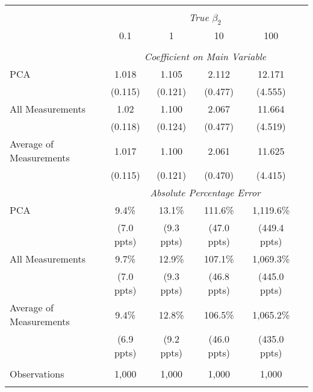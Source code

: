 \begin{table}[!htbp] \centering
\begin{tabular}{@{\extracolsep{5pt}}lccccc}
\\[-1.8ex]\hline
\hline \\[-1.8ex]
& \multicolumn{5}{c}{\textit{True $\beta_2$}} \
\cr \cline{5-6}
\\[-1.8ex] & 0.1 & 1 & 10 & 100 \\
\hline \\[-1.8ex]
& \multicolumn{5}{c}{\textit{Coefficient on Main Variable}} \\
 PCA & 1.018 & 1.105 & 2.112 & 12.171  \\
  & (0.115) & (0.121) & (0.477) & (4.555)\\
 All Measurements & 1.02 & 1.100 & 2.067 & 11.664  \\
  & (0.118) & (0.124) & (0.477) & (4.519)\\
 Average of Measurements & 1.017 & 1.100 & 2.061 & 11.625  \\
  & (0.115) & (0.121) & (0.470) & (4.415)\\
& \multicolumn{5}{c}{\textit{Absolute Percentage Error}} \\
  PCA & 9.4\% & 13.1\% & 111.6\% & 1,119.6\%  \\
   & (7.0 ppts) & (9.3 ppts) & (47.0 ppts) & (449.4 ppts)\\
All Measurements & 9.7\% & 12.9\% & 107.1\% & 1,069.3\%  \\
  & (7.0 ppts) & (9.3 ppts) & (46.8 ppts) & (445.0 ppts)\\
  Average of Measurements & 9.4\% & 12.8\% & 106.5\% & 1,065.2\%  \\
  & (6.9 ppts) & (9.2 ppts) & (46.0 ppts) & (435.0 ppts)\\
\hline \\[-1.8ex]
 Observations & 1,000 & 1,000 & 1,000 & 1,000 &\\
\hline
\hline \\[-1.8ex]
\end{tabular}
\end{table}

